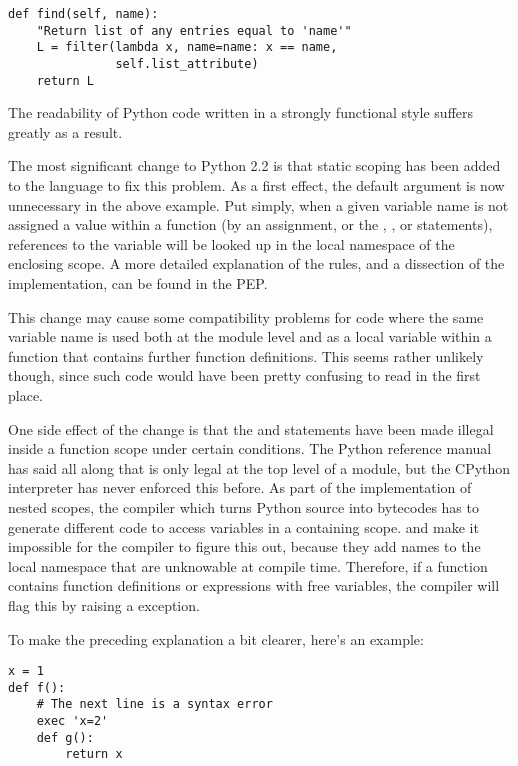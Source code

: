 \documentclass{howto}
\begin{document}
\begin{verbatim}
def find(self, name):
    "Return list of any entries equal to 'name'"
    L = filter(lambda x, name=name: x == name,
               self.list_attribute)
    return L
\end{verbatim}

The readability of Python code written in a strongly functional style
suffers greatly as a result.

The most significant change to Python 2.2 is that static scoping has
been added to the language to fix this problem.  As a first effect,
the  default argument is now unnecessary in the above
example.  Put simply, when a given variable name is not assigned a
value within a function (by an assignment, or the ,
, or  statements), references to the
variable will be looked up in the local namespace of the enclosing
scope.  A more detailed explanation of the rules, and a dissection of
the implementation, can be found in the PEP.

This change may cause some compatibility problems for code where the
same variable name is used both at the module level and as a local
variable within a function that contains further function definitions.
This seems rather unlikely though, since such code would have been
pretty confusing to read in the first place.  

One side effect of the change is that the  and  statements have been made illegal inside
a function scope under certain conditions.  The Python reference
manual has said all along that  is
only legal at the top level of a module, but the CPython interpreter
has never enforced this before.  As part of the implementation of
nested scopes, the compiler which turns Python source into bytecodes
has to generate different code to access variables in a containing
scope.   and  make it
impossible for the compiler to figure this out, because they add names
to the local namespace that are unknowable at compile time.
Therefore, if a function contains function definitions or
 expressions with free variables, the compiler will
flag this by raising a  exception.

To make the preceding explanation a bit clearer, here's an example:

\begin{verbatim}
x = 1
def f():
    # The next line is a syntax error
    exec 'x=2'  
    def g():
        return x
\end{verbatim}
\end{document}
